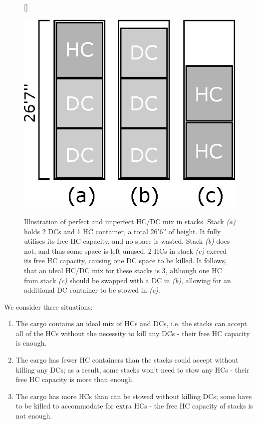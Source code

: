 \documentclass[preprint,11pt,3p]{elsarticle}
\begin{document}
\begin{figure}[ht]
[\FBwidth]
{\caption[Illustration of perfect and imperfect HC/DC mix in stacks.]{Illustration of perfect and imperfect HC/DC mix in stacks. Stack \textit{(a)} holds 2 DCs and 1 HC container, a total 26'6'' of height. It fully utilises its free HC capacity, and no space is wasted. Stack \textit{(b)} does not, and thus some space is left unused. 2 HCs in stack \textit{(c)} exceed its free HC capacity, causing one DC space to be killed. It follows, that an ideal HC/DC mix for these stacks is 3, although one HC from stack \textit{(c)} should be swapped with a DC in \textit{(b)}, allowing for an additional DC container to be stowed in \textit{(c)}.}\label{fig:hcdc}}
{\includegraphics[width=0.7\linewidth]{Figures/hcdc_stacks.eps}}
\end{figure}

We consider three situations:
\begin{enumerate}[noitemsep]
    \item The cargo contains an ideal mix of HCs and DCs, i.e. the stacks can accept all of the HCs without the necessity to kill any DCs - their free HC capacity is enough.
    \item The cargo has fewer HC containers than the stacks could accept without killing any DCs; as a result, some stacks won't need to stow any HCs - their free HC capacity is more than enough.
    \item The cargo has more HCs than can be stowed without killing DCs; some have to be killed to accommodate for extra HCs - the free HC capacity of stacks is not enough.
\end{enumerate}
\end{document}
